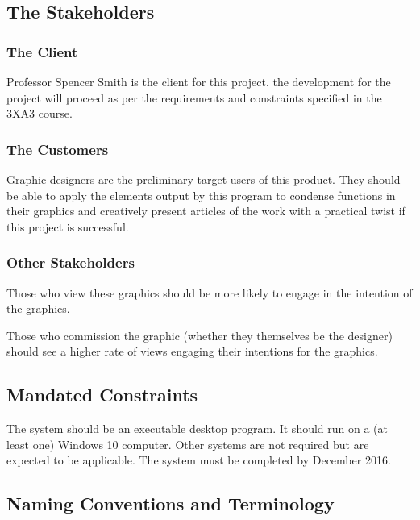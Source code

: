 \documentclass[12pt, titlepage]{article}
\begin{document}
\subsection{The Stakeholders}
	
\subsubsection{The Client}

	Professor Spencer Smith is the client for this project. %
	the development for 
	the project will proceed as per the requirements and constraints specified 
	in the 3XA3 course.

\subsubsection{The Customers}

	Graphic designers are the preliminary target users of this product. 
	They should be able to apply the elements output by this program to 
	condense functions in their graphics and creatively present articles of 
	the work with a practical twist if this project is successful.

\subsubsection{Other Stakeholders}

	Those who view these graphics should be more likely to engage in the 
	intention of the graphics.
	
	Those who commission the graphic (whether they themselves be the 
	designer) should see a higher rate of views engaging their intentions 
	for the graphics.

\subsection{Mandated Constraints}

	The system should be an executable desktop program. It should run on a (at 
	least one) Windows 10 computer. Other systems are not required but are 
	expected to be applicable. The system must be completed by December 2016.

\subsection{Naming Conventions and Terminology}

		\paragraph{}
		
\end{document}
